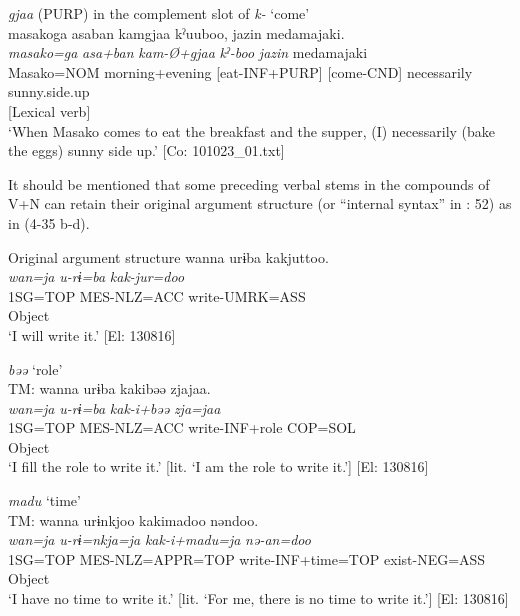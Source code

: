 \ex \textit{gjaa} (PURP) in the complement slot of \textit{k-} ‘come’\\
\gllll masakoga  {\textbar}asaban{\textbar}  kamgjaa  kˀuuboo,  jazin   {\textbar}medamajaki{\textbar}.\\
      \textit{masako=ga}  \textit{asa+ban}  \textit{kam-Ø+gjaa}  \textit{kˀ-boo}  \textit{jazin} medamajaki\\                                                                                                
      Masako=NOM  morning+evening  [eat-INF+PURP]  [come-CND]  necessarily                       sunny.side.up\\                                                                                                
          [Complement]  [Lexical verb]\\
\glt  ‘When Masako comes to eat the breakfast and the supper, (I) necessarily (bake the eggs) sunny side up.’   [Co: 101023\_01.txt]
\z
\z

It should be mentioned that some preceding verbal stems in the compounds of V+N can retain their original argument structure (or “internal syntax” in \citealt{Haspelmath1996}: 52) as in (4-35 b-d).

\ea  
\ea Original argument structure \label{ex:4.35}
\gllll  wanna  urɨba  kakjuttoo.\\
    \textit{wan=ja}  \textit{u-rɨ=ba}  \textit{kak-jur=doo}\\
    1SG=TOP  MES-NLZ=ACC  write-UMRK=ASS\\
      Object  \\
    \glt     ‘I will write it.’ [El: 130816]

\ex \textit{bəə} ‘role’\\
\gllll  TM:  wanna  urɨba  kakibəə  zjajaa.\\
    \textit{wan=ja}  \textit{u-rɨ=ba}  \textit{kak-i+bəə}  \textit{zja=jaa}\\
    1SG=TOP  MES-NLZ=ACC  write-INF+role  COP=SOL\\
      Object  \\
    \glt     ‘I fill the role to write it.’ [lit. ‘I am the role to write it.’] [El: 130816]

\ex \textit{madu} ‘time’\\
\gllll  TM:  wanna  urɨnkjoo  kakimadoo  nəndoo.\\
    \textit{wan=ja}  \textit{u-rɨ=nkja=ja}  \textit{kak-i+madu=ja}  \textit{nə-an=doo}\\
    1SG=TOP  MES-NLZ=APPR=TOP  write-INF+time=TOP  exist-NEG=ASS\\
      Object    \\
    \glt     ‘I have no time to write it.’ [lit. ‘For me, there is no time to write it.’] [El: 130816]

